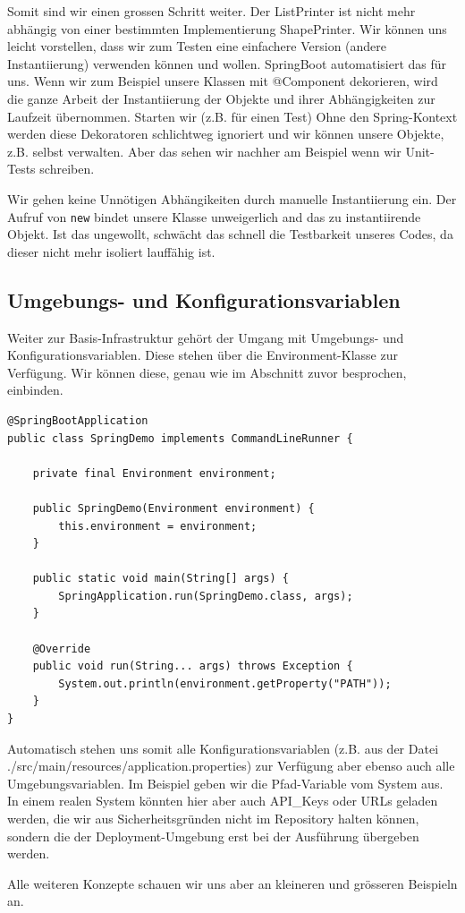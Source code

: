 Somit sind wir einen grossen Schritt weiter. Der ListPrinter ist nicht mehr 
abhängig von einer bestimmten Implementierung ShapePrinter. Wir können uns 
leicht vorstellen, dass wir zum Testen eine einfachere Version (andere 
Instantiierung) verwenden können und wollen.
SpringBoot automatisiert das für uns. Wenn wir zum Beispiel unsere Klassen
mit @Component
dekorieren, wird die ganze Arbeit der Instantiierung der Objekte und ihrer
Abhängigkeiten zur Laufzeit übernommen. Starten wir (z.B. für einen Test) 
Ohne den Spring-Kontext werden
diese Dekoratoren schlichtweg ignoriert und wir können unsere Objekte, z.B.
selbst verwalten. Aber das sehen wir nachher am Beispiel wenn wir Unit-Tests
schreiben.

\begin{rulebox}[label=rule:inversionOfControl]{Wir gehen keine
    Unnötigen Abhängikeiten durch manuelle Instantiierung ein.}
Der Aufruf von \texttt{new} bindet unsere Klasse unweigerlich and das
zu instantiirende Objekt. Ist das ungewollt, schwächt das schnell
die Testbarkeit unseres Codes, da dieser nicht mehr isoliert lauffähig
ist.
\end{rulebox}

\subsection{Umgebungs- und Konfigurationsvariablen}
Weiter zur Basis-Infrastruktur gehört der Umgang mit Umgebungs- und 
Konfigurationsvariablen. Diese stehen über die Environment-Klasse zur 
Verfügung. Wir können diese, genau wie im Abschnitt zuvor besprochen,
einbinden.

\begin{listing}[H]
\begin{verbatim}
@SpringBootApplication
public class SpringDemo implements CommandLineRunner {

    private final Environment environment;

    public SpringDemo(Environment environment) {
        this.environment = environment;
    }

    public static void main(String[] args) {
        SpringApplication.run(SpringDemo.class, args);
    }

    @Override
    public void run(String... args) throws Exception {
        System.out.println(environment.getProperty("PATH"));
    }
}
\end{verbatim}
\caption{Properties einlesen}
\label{lst:properties}
\end{listing}

Automatisch stehen uns somit alle Konfigurationsvariablen (z.B. aus der Datei
./src/main/resources/application.properties) zur Verfügung aber ebenso auch 
alle Umgebungsvariablen. Im Beispiel geben wir die Pfad-Variable vom System 
aus. In einem realen System könnten hier aber auch API\_Keys oder URLs 
geladen werden, die wir aus Sicherheitsgründen nicht im Repository halten
können, sondern die der Deployment-Umgebung erst bei der Ausführung übergeben
werden. 

Alle weiteren Konzepte schauen wir uns aber an kleineren und 
grösseren Beispieln an.
